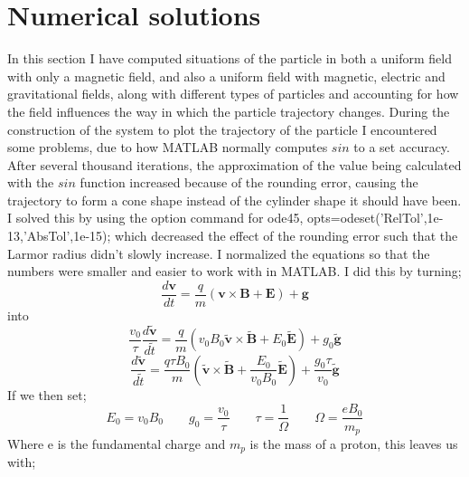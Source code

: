 \documentclass[14paper,11pt,hidelinks]{article}
\begin{document}
\section{Numerical solutions}
In this section I have computed situations of the particle in both a uniform field with only a magnetic field, and also a uniform field with magnetic, electric and gravitational fields, along with different types of particles and accounting for how the field influences the way in which the particle trajectory changes. During the construction of the system to plot the trajectory of the particle I encountered some problems, due to how MATLAB normally computes \begin{math} sin \end{math} to a set accuracy. After several thousand iterations, the approximation of the value being calculated with the \begin{math} sin \end{math} function increased because of the rounding error, causing the trajectory to form a cone shape instead of the cylinder shape it should have been. I solved this by using the option command for ode45, opts=odeset('RelTol',1e-13,'AbsTol',1e-15); which decreased the effect of the rounding error such that the Larmor radius didn't slowly increase.
\newline
\newline
I normalized the equations so that the numbers were smaller and easier to work with in MATLAB.  I did this by turning;
\begin{equation}
\frac{d\mathbf{v}}{dt}=\frac{q}{m}\left(\mathbf{v}\times\mathbf{B}+\mathbf{E}\right)+\mathbf{g}
\end{equation}
into
\begin{equation}
\frac{v_0}{\tau}\frac{d\tilde{\mathbf{v}}}{d\tilde{t}}=\frac{q}{m}\left(v_0B_0\tilde{\mathbf{v}}\times\tilde{\mathbf{B}}+E_0\tilde{\mathbf{E}}\right)+g_0\tilde{\mathbf{g}}
\end{equation}
\begin{equation}
\frac{d\tilde{\mathbf{v}}}{d\tilde{t}}=\frac{q\tau B_0}{m}\left(\tilde{\mathbf{v}}\times\tilde{\mathbf{B}}+\frac{E_0}{v_0B_0}\tilde{\mathbf{E}}\right)+\frac{g_0\tau}{v_0}\tilde{\mathbf{g}}
\end{equation}
If we then set;
\begin{equation}
E_0=v_0B_0 
\qquad
g_0=\frac{v_0}{\tau}
\qquad
\tau=\frac{1}{\Omega}
\qquad
\Omega=\frac{eB_0}{m_p}
\end{equation}
Where e is the fundamental charge and \begin {math} m_p\end{math} is the mass of a proton, this leaves us with;
\end{document}
